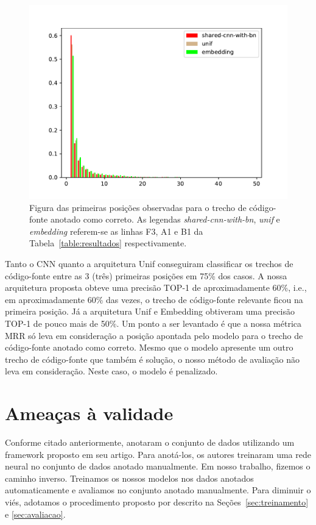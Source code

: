 \begin{figure}[h]
    \centering
    \includegraphics[width=1\textwidth]{figuras/cap-resultados/histogram.pdf}
    \caption{Figura das primeiras posições observadas para o trecho de código-fonte anotado como correto. As legendas \emph{shared-cnn-with-bn}, \emph{unif} e \emph{embedding} referem-se as linhas F3, A1 e B1 da Tabela~\ref{table:resultados} respectivamente.}
    \label{fig:histogram-mrr}
\end{figure}


Tanto o CNN quanto a arquitetura Unif conseguiram classificar os trechos de código-fonte entre as 3 (três) primeiras posições em 75\% dos casos. A nossa arquitetura proposta obteve uma precisão TOP-1 de aproximadamente 60\%, i.e., em aproximadamente 60\% das vezes, o trecho de código-fonte relevante ficou na primeira posição. Já a arquitetura Unif e Embedding obtiveram uma precisão TOP-1 de pouco mais de 50\%. Um ponto a ser levantado é que a nossa métrica MRR só leva em consideração a posição apontada pelo modelo para o trecho de código-fonte anotado como correto. Mesmo que o modelo apresente um outro trecho de código-fonte que também é solução, o nosso método de avaliação não leva em consideração. Neste caso, o modelo é penalizado.



\section{Ameaças à validade}

Conforme citado anteriormente, \cite{yao-2018} anotaram o conjunto de dados utilizando um framework proposto em seu artigo. Para anotá-los, os autores treinaram uma rede neural no conjunto de dados anotado manualmente. Em nosso trabalho, fizemos o caminho inverso. Treinamos os nossos modelos nos dados anotados automaticamente e avaliamos no conjunto anotado manualmente. Para diminuir o viés, adotamos o procedimento proposto por \cite{iyer-etal-2016-summarizing} descrito na Seções~\ref{sec:treinamento} e \ref{sec:avaliacao}.

